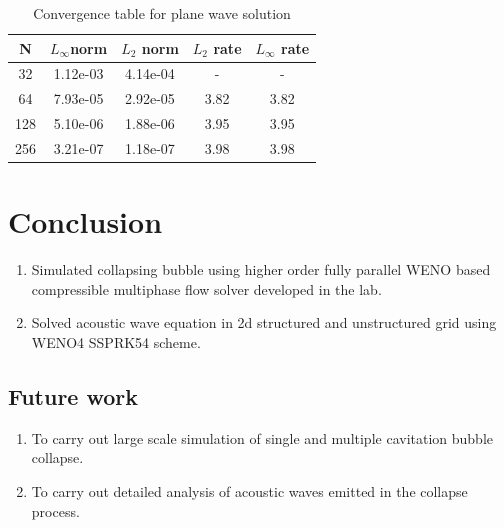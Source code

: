 \documentclass[12pt]{article}
\begin{document}
  \begin{table}[h!]
	  \centering
	  \begin{tabular}{ |c|c|c|c|c| } 
		\hline
		N   & $L_{\infty}$norm & $L_{2}$ norm & $L_{2}$ rate & $L_{\infty}$ rate \\ 
		\hline
		32  & 1.12e-03         & 4.14e-04     & -            & -                 \\
		64  & 7.93e-05         & 2.92e-05     & 3.82         & 3.82              \\
		128 & 5.10e-06         & 1.88e-06     & 3.95         & 3.95              \\
		256 & 3.21e-07         & 1.18e-07     & 3.98         & 3.98              \\
		\hline
	\end{tabular}
	\caption{Convergence table for plane wave solution}
	\label{table:2}
  \end{table}
\section*{Conclusion}
\begin{enumerate}
	\item Simulated collapsing bubble using higher order fully parallel WENO based compressible multiphase flow solver developed in the lab.
	\item Solved acoustic wave equation in 2d structured and unstructured grid using WENO4 SSPRK54 scheme.
\end{enumerate}
\subsection*{Future work}
\begin{enumerate}
	\item To carry out large scale simulation of single and multiple cavitation bubble collapse.
	\item To carry out detailed analysis of acoustic waves emitted in the collapse process. 

\end{enumerate}
\printbibliography
\end{document}
